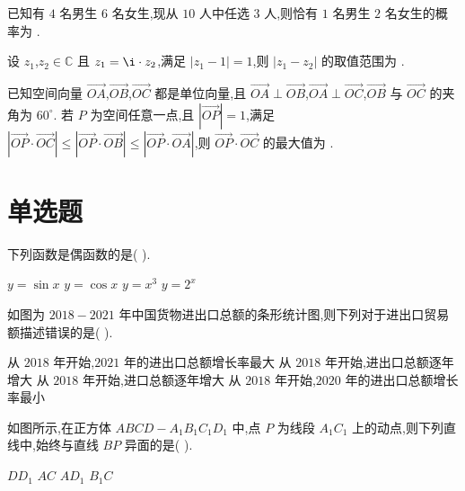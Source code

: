 \begin{problem}
已知有 \(4\) 名男生 \(6\) 名女生,现从 \(10\) 人中任选 \(3\) 人,则恰有 \(1\) 名男生 \(2\) 名女生的概率为\fillinblank{} .
\end{problem}

\begin{problem}
设 \(z_1\),\(z_2\in \mathbb{C}\) 且 \(z_1=\i\cdot z_2\),满足 \(\left|z_1-1\right|=1\),则 \(\left|z_1-z_2\right|\) 的取值范围为\fillinblank{} .
\end{problem}

\begin{problem}
已知空间向量 \(\overrightarrow{OA}\),\(\overrightarrow{OB}\),\(\overrightarrow{OC}\) 都是单位向量,且 \(\overrightarrow{OA}\perp \overrightarrow{OB}\),\(\overrightarrow{OA}\perp \overrightarrow{OC}\),\(\overrightarrow{OB}\) 与 \(\overrightarrow{OC}\) 的夹角为 \(60^\circ\). 若 \(P\) 为空间任意一点,且 \(\left|\overrightarrow{OP}\right|=1\),满足 \(\left|\overrightarrow{OP}\cdot\overrightarrow{OC}\right|\le \left|\overrightarrow{OP}\cdot\overrightarrow{OB}\right|\le \left|\overrightarrow{OP}\cdot\overrightarrow{OA}\right|\),则 \(\overrightarrow{OP}\cdot\overrightarrow{OC}\) 的最大值为\fillinblank{} .
\end{problem}

\section{单选题}

\begin{problem}
下列函数是偶函数的是( \quad ).

\choices
    {\(y=\sin x\)}
    {\(y=\cos x\)}
    {\(y=x^3\)}
    {\(y=2^x\)}
\end{problem}

\begin{problem}
如图为 \(2018-2021\) 年中国货物进出口总额的条形统计图,则下列对于进出口贸易额描述错误的是( \quad ).


\choices
    {从 \(2018\) 年开始,\(2021\) 年的进出口总额增长率最大}
    {从 \(2018\) 年开始,进出口总额逐年增大}
    {从 \(2018\) 年开始,进口总额逐年增大}
    {从 \(2018\) 年开始,\(2020\) 年的进出口总额增长率最小}
\end{problem}

\begin{problem}
如图所示,在正方体 \(ABCD-A_1B_1C_1D_1\) 中,点 \(P\) 为线段 \(A_1C_1\) 上的动点,则下列直线中,始终与直线 \(BP\) 异面的是( \quad ).


\choices
    {\(DD_1\)}
    {\(AC\)}
    {\(AD_1\)}
    {\(B_1C\)}
\end{problem}

